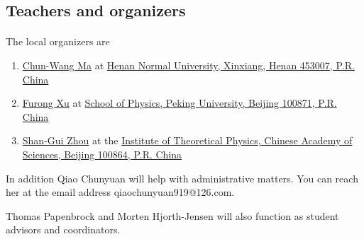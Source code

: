 \documentclass[%
oneside,                 %
final,                   %
10pt]{article}
\begin{document}
\noindent



\subsection*{Teachers and organizers}

\paragraph{}
The local organizers are 

\begin{enumerate}
\item \href{{https://www.researchgate.net/profile/Chun-Wang_Ma}}{Chun-Wang Ma} at \href{{http://www.htu.cn/english/}}{Henan Normal University, Xinxiang, Henan 453007, P.R. China}

\item \href{{http://www.phy.pku.edu.cn/~frxu/}}{Furong Xu} at \href{{http://english.pku.edu.cn/}}{School of Physics, Peking University, Beijing 100871, P.R. China}

\item \href{{http://www.itp.ac.cn/~sgzhou/eindex.html}}{Shan-Gui Zhou} at  the \href{{http://www.cas.ac.cn/}}{Institute of Theoretical Physics, Chinese Academy of Sciences, Beijing 100864, P.R. China} 
\end{enumerate}

\noindent
In addition Qiao Chunyuan will help with administrative matters. You can reach her at the email address qiaochunyuan919@126.com.

Thomas Papenbrock and Morten Hjorth-Jensen  will also function as student advisors and coordinators.
\end{document}
